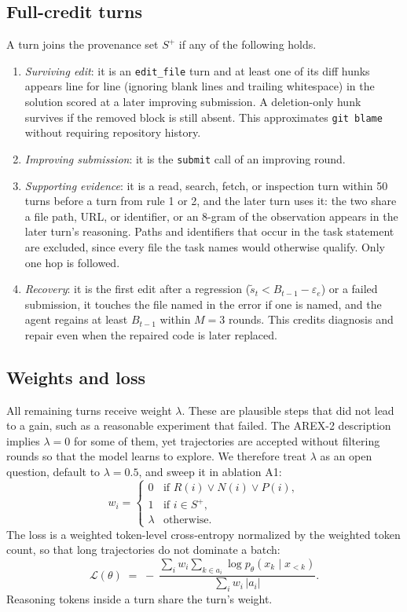 \documentclass[11pt]{article}
\newcommand{\stilde}{\tilde{s}}
\newcommand{\splus}{S^{+}}
\newcommand{\code}[1]{\texttt{#1}}
\begin{document}
\subsection{Full-credit turns}
A turn joins the provenance set $\splus$ if any of the following holds.
\begin{enumerate}
  \item \emph{Surviving edit}: it is an \code{edit\_file} turn and at least one of its diff hunks appears line for line (ignoring blank lines and trailing whitespace) in the solution scored at a later improving submission. A deletion-only hunk survives if the removed block is still absent. This approximates \code{git blame} without requiring repository history.
  \item \emph{Improving submission}: it is the \code{submit} call of an improving round.
  \item \emph{Supporting evidence}: it is a read, search, fetch, or inspection turn within 50 turns before a turn from rule 1 or 2, and the later turn uses it: the two share a file path, URL, or identifier, or an 8-gram of the observation appears in the later turn's reasoning. Paths and identifiers that occur in the task statement are excluded, since every file the task names would otherwise qualify. Only one hop is followed.
  \item \emph{Recovery}: it is the first edit after a regression ($\stilde_t < B_{t-1} - \varepsilon_e$) or a failed submission, it touches the file named in the error if one is named, and the agent regains at least $B_{t-1}$ within $M=3$ rounds. This credits diagnosis and repair even when the repaired code is later replaced.
\end{enumerate}

\subsection{Weights and loss}
All remaining turns receive weight $\lambda$. These are plausible steps that did not lead to a gain, such as a reasonable experiment that failed. The AREX-2 description implies $\lambda=0$ for some of them, yet trajectories are accepted without filtering rounds so that the model learns to explore. We therefore treat $\lambda$ as an open question, default to $\lambda = 0.5$, and sweep it in ablation A1:
\begin{equation}
  w_i =
  \begin{cases}
    0 & \text{if } R(i) \lor N(i) \lor P(i),\\
    1 & \text{if } i \in \splus,\\
    \lambda & \text{otherwise.}
  \end{cases}
  \label{eq:weights}
\end{equation}
The loss is a weighted token-level cross-entropy normalized by the weighted token count, so that long trajectories do not dominate a batch:
\begin{equation}
  \mathcal{L}(\theta) \;=\; -\,\frac{\sum_{i} w_i \sum_{k \in a_i} \log p_\theta(x_k \mid x_{<k})}{\sum_{i} w_i\, |a_i|}.
  \label{eq:loss}
\end{equation}
Reasoning tokens inside a turn share the turn's weight.
\end{document}
